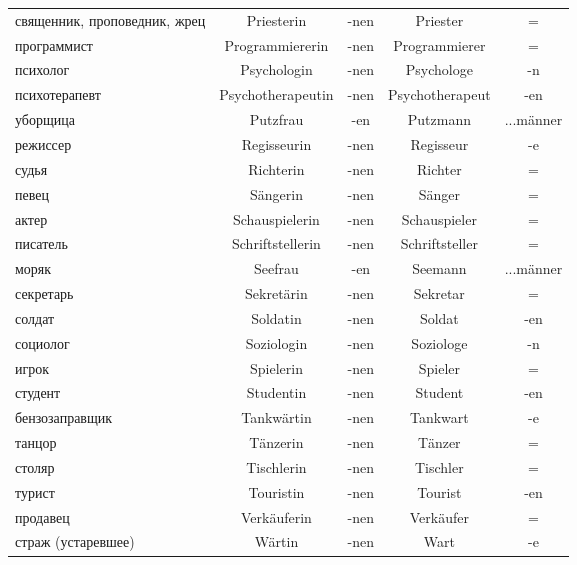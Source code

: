 \begin{longtable}{|p{4cm}|c|c|c|c|}
 священник, проповедник, жрец & Priesterin & -nen & Priester & = \\
 программист & Programmiererin & -nen & Programmierer & = \\
 психолог & Psychologin & -nen & Psychologe & -n \\
 психотерапевт & Psychotherapeutin & -nen & Psychotherapeut & -en \\
 уборщица & Putzfrau & -en & Putzmann & ...m\"anner \\
 режиссер & Regisseurin & -nen & Regisseur & -e \\
 судья & Richterin & -nen & Richter & = \\
 певец & S\"angerin & -nen & S\"anger & = \\
 актер & Schauspielerin & -nen & Schauspieler & = \\
 писатель & Schriftstellerin & -nen & Schriftsteller & = \\
 моряк & Seefrau & -en & Seemann & ...m\"anner \\
 секретарь & Sekret\"arin & -nen & Sekretar & = \\
 солдат & Soldatin & -nen & Soldat & -en \\
 социолог & Soziologin & -nen & Soziologe & -n \\
 игрок & Spielerin & -nen & Spieler & = \\
 студент & Studentin & -nen & Student & -en \\
 бензозаправщик & Tankw\"artin & -nen & Tankwart & -e \\
 танцор & T\"anzerin & -nen & T\"anzer & = \\
 столяр & Tischlerin & -nen & Tischler & = \\
 турист & Touristin & -nen & Tourist & -en \\
 продавец & Verk\"auferin & -nen & Verk\"aufer & = \\
 страж (устаревшее) & W\"artin & -nen & Wart & -e \\
\hline
\end{longtable}
